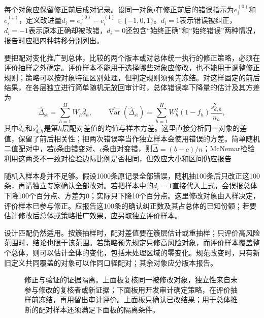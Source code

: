 每个对象应保留修正前后成对记录。设同一对象$i$在修正前后的错误指示为$e_i^{(0)}$和$e_i^{(1)}$，定义改进量$d_i=e_i^{(0)}-e_i^{(1)}\in\{-1,0,1\}$。$d_i=1$表示错误被纠正，$d_i=-1$表示原本正确却被改错，$d_i=0$还包含“始终正确”和“始终错误”两种情况，报告时应把四种转移分别列出。

要把配对变化推广到总体，比较的两个版本或对总体统一执行的修正策略，必须在评价抽样之外确定。评价样本不能用于选择哪些对象应修改，也不能用于调整修正规则；策略可以按对象特征区别处理，但判定规则须预先冻结。对这样固定的前后结果，在各层独立进行简单随机无放回审计时，总体错误率下降量的估计及其方差为
\begin{equation}
  \widehat\Delta_{\mathrm{st}}
  =
  \sum_{h=1}^{H}W_h\overline d_h,
  \qquad
  \widehat{\operatorname{Var}}(\widehat\Delta_{\mathrm{st}})
  =
  \sum_{h=1}^{H}W_h^2(1-f_h)\frac{s_{d,h}^2}{n_h},
  \label{eq:knowledge-quality-assessment-correction-paired-difference}
\end{equation}
其中$\overline d_h$和$s_{d,h}^2$是第$h$层配对差值的均值与样本方差。这里直接分析同一对象的差值，保留了前后相关性；把两次错误率当作独立样本会使用错误的方差。简单随机二值配对中，若$b$条由错变对、$c$条由对变错，则$\widehat\Delta=(b-c)/n$；McNemar检验利用这两类不一致对检验边际比例是否相同，但效应大小和区间仍应报告

随机入样本身并不足够。假设1000条原记录全部错误，随机抽100条后只改正这100条，再请独立专家确认全部改对。若把样本中的$d_i=1$直接代入上式，会误报总体下降100个百分点、方差为0；实际只下降10个百分点。这里修改对象由入样决定，评价样本已参与修正。应报告这100条的确认纠正数及其占总体的已知份额；若要估计修改后总体或策略推广效果，应另取独立评价样本。

设计匹配仍然适用。按簇抽样时，配对差值要在簇层估计或重抽样；只评价高风险范围时，结论也限于该范围。若策略预先规定只修高风险对象，而评价样本覆盖整个总体，则可以估计全体的变化，包括未处理区域的零变化。规范改变时，只有新旧定义共同覆盖的对象可以作同口径配对；其余对象应分版本报告。

\begin{figure}[htbp]
  \centering
  
  \caption{修正与验证的证据隔离。上面板复核同一被修改对象，独立性来自未参与修改的复核者或新证据；下面板用开发审计确定策略，在评价抽样前冻结，再用留出审计评价。上面板只确认已改结果；用于总体推断的配对样本还须满足下面板的隔离条件。}
  \label{fig:knowledge-quality-assessment-correction-evidence-isolation}
\end{figure}


